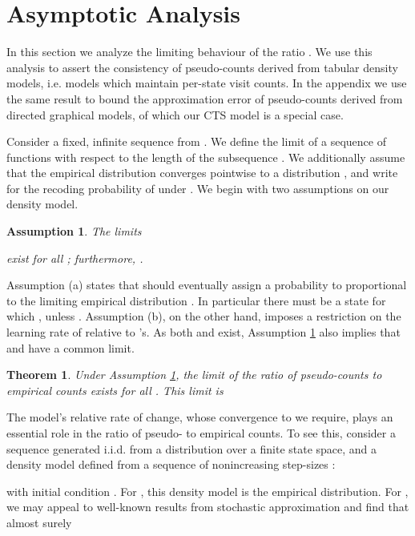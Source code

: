 \documentclass{article}
\newtheorem{assum}{Assumption}
\newtheorem{thm}{Theorem}
\begin{document}
\section{Asymptotic Analysis}\label{sec:asymptotic_results}

In this section we analyze the limiting behaviour of the ratio . We use this analysis to assert the consistency of pseudo-counts derived from tabular density models, i.e. models which maintain per-state visit counts. In the appendix we use the same result to bound the approximation error of pseudo-counts derived from directed graphical models, of which our CTS model is a special case.

Consider a fixed, infinite sequence  from . 
We define the limit of a sequence of functions  with respect to the length  of the subsequence .
We additionally assume that the empirical distribution  converges pointwise to a distribution ,
and write  for the recoding probability of  under . We begin with two assumptions on our density model.
\begin{assum}\label{assum:limit_assumptions}
The limits 

exist for all ; furthermore, . 
\end{assum}
Assumption (a) states that  should eventually assign a probability to  proportional to the limiting empirical distribution .
In particular there must be a state  for which , unless .
Assumption (b), on the other hand, imposes a restriction
on the learning rate of  relative to 's.
As both  and  exist, Assumption \ref{assum:limit_assumptions} also implies
that  and  have a common limit.

\begin{thm}\label{thm:ratio_of_counts}
Under Assumption \ref{assum:limit_assumptions}, the limit of the ratio of pseudo-counts  to empirical counts  exists for all . This limit is 

\end{thm}

The model's relative rate of change, whose convergence to  we require, plays an essential role in
the ratio of pseudo- to empirical counts. To see this,
consider a sequence  generated i.i.d. from a distribution  over a finite state space, and a density model defined from a sequence of nonincreasing step-sizes :

with initial condition . For , this density
model is the empirical distribution. For , we may appeal to well-known results from stochastic approximation \citep[e.g.][]{bertsekas96neurodynamic} and find that almost surely 
\end{document}
